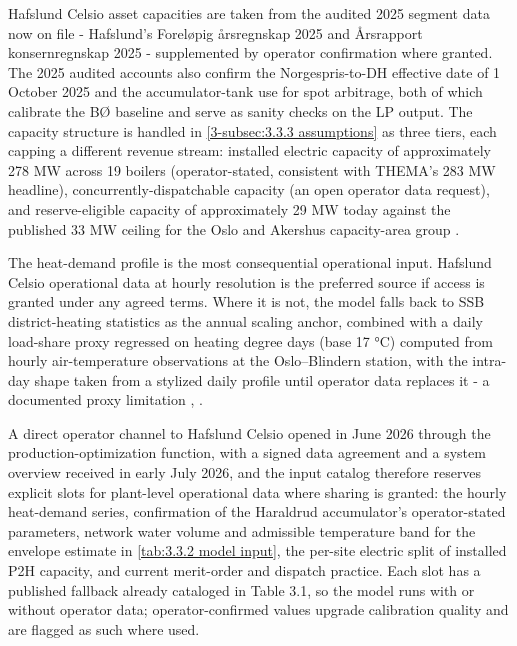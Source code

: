 Hafslund Celsio asset capacities are taken from the audited 2025 segment data now on file - Hafslund's Foreløpig årsregnskap 2025 and Årsrapport konsernregnskap 2025 - supplemented by operator confirmation where granted. The 2025 audited accounts also confirm the Norgespris-to-DH effective date of 1 October 2025 and the accumulator-tank use for spot arbitrage, both of which calibrate the BØ baseline and serve as sanity checks on the LP output. The capacity structure is handled in \autoref{3-subsec:3.3.3 assumptions} as three tiers, each capping a different revenue stream: installed electric capacity of approximately 278 MW across 19 boilers (operator-stated, consistent with THEMA's 283 MW headline), concurrently-dispatchable capacity (an open operator data request), and reserve-eligible capacity of approximately 29 MW today against the published 33 MW ceiling for the Oslo and Akershus capacity-area group \cite{statnett_innforing_2026}.

The heat-demand profile is the most consequential operational input. Hafslund Celsio operational data at hourly resolution is the preferred source if access is granted under any agreed terms. Where it is not, the model falls back to SSB district-heating statistics as the annual scaling anchor, combined with a daily load-share proxy regressed on heating degree days (base 17 °C) computed from hourly air-temperature observations at the Oslo–Blindern station, with the intra-day shape taken from a stylized daily profile until operator data replaces it - a documented proxy limitation \cite{statistisk_sentralbyra_statbank_nodate}, \cite{norsk_klima_service_senter_observasjoner_nodate}
.

A direct operator channel to Hafslund Celsio opened in June 2026 through the production-optimization function, with a signed data agreement and a system overview received in early July 2026, and the input catalog therefore reserves explicit slots for plant-level operational data where sharing is granted: the hourly heat-demand series, confirmation of the Haraldrud accumulator's operator-stated parameters, network water volume and admissible temperature band for the envelope estimate in \autoref{tab:3.3.2 model input}, the per-site electric split of installed P2H capacity, and current merit-order and dispatch practice. Each slot has a published fallback already cataloged in Table 3.1, so the model runs with or without operator data; operator-confirmed values upgrade calibration quality and are flagged as such where used. 

